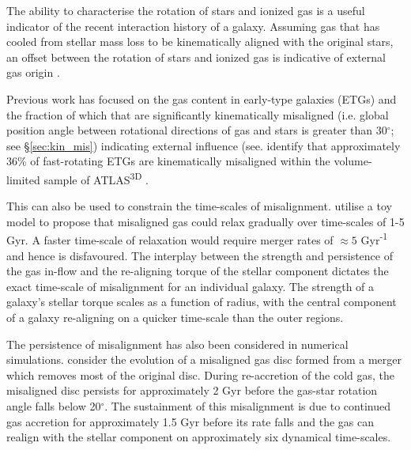  The ability to characterise the rotation of stars and ionized gas is a useful indicator of the recent interaction history of a galaxy. Assuming gas that has cooled from stellar mass loss to be kinematically aligned with the original stars, an offset between the rotation of stars and ionized gas is indicative of external gas origin \citep[see][]{sarzi2006,davis2011a}. 

 Previous work has focused on the gas content in early-type galaxies (ETGs) and the fraction of which that are significantly kinematically misaligned (i.e. global position angle between rotational directions of gas and stars is greater than 30$^{\circ}$; see \S\ref{sec:kin_mis}) indicating external influence (see. \citet{davis2011a} identify that approximately 36\% of fast-rotating ETGs are kinematically misaligned within the volume-limited sample of ATLAS\textsuperscript{3D} \citep{atlas3d}. 

This can also be used to constrain the time-scales of misalignment. \citet{davis2016} utilise a toy model to propose that misaligned gas could relax gradually over time-scales of 1-5 Gyr. A faster time-scale of relaxation would require merger rates of $\approx 5$ Gyr\textsuperscript{-1} and hence is disfavoured. The interplay between the strength and persistence of the gas in-flow and the re-aligning torque of the stellar component dictates the exact time-scale of misalignment for an individual galaxy. The strength of a galaxy's stellar torque scales as a function of radius, with the central component of a galaxy re-aligning on a quicker time-scale than the outer regions. 

The persistence of misalignment has also been considered in numerical simulations. \citet{vdvoort2015} consider the evolution of a misaligned gas disc formed from a merger which removes most of the original disc. During re-accretion of the cold gas, the misaligned disc persists for approximately 2 Gyr before the gas-star rotation angle falls below 20$^{\circ}$. The sustainment of this misalignment is due to continued gas accretion for approximately 1.5 Gyr before its rate falls and the gas can realign with the stellar component on approximately six dynamical time-scales. 

